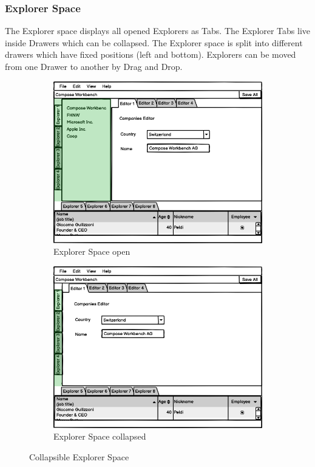 \subsubsection{Explorer Space}

The Explorer space displays all opened Explorers as Tabs. The Explorer Tabs live inside Drawers which can be collapsed. The Explorer space is split into different drawers which have fixed positions (left and bottom). Explorers can be moved from one Drawer to another by Drag and Drop. 

\begin{figure}[H]
\centering
\begin{subfigure}{.5\textwidth}
  \centering
  \includegraphics[width=.9\linewidth]{images/WorkbenchCompose (ExplorerSpaceCollapsed0) (ExplorerSpaceCollapsed0).png}
  \caption{Explorer Space open}
  \label{fig:ransac_result}
\end{subfigure}%
\begin{subfigure}{.5\textwidth}
  \centering
  \includegraphics[width=.9\linewidth]{images/WorkbenchCompose (ExplorerSpaceCollapsed) (ExplorerSpaceCollapsed).png}
  \caption{Explorer Space collapsed}
  \label{fig:ransac_rotation}
\end{subfigure}
\caption{Collapsible Explorer Space}
\label{fig:ransac_results}
\end{figure}


